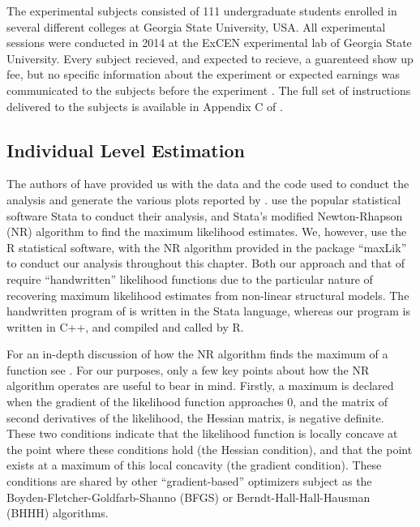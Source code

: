\documentclass[../main.tex]{subfiles}
\begin{document}
The experimental subjects consisted of 111 undergraduate students enrolled in several different colleges at Georgia State University, USA.
All experimental sessions were conducted in 2014 at the ExCEN experimental lab of Georgia State University. 
Every subject recieved, and expected to recieve, a guarenteed  show up fee, but no specific information about the experiment or expected earnings was communicated to the subjects before the experiment \parencite[98]{Harrison2016}.
The full set of instructions delivered to the subjects is available in Appendix C of \textcite{Harrison2016}.

\subsection{Individual Level Estimation}
\label{sec4:ILE}

The authors of \textcite{Harrison2016} have provided us with the data and the code used to conduct the analysis and generate the various plots reported by \textcite{Harrison2016}.
\textcite{Harrison2016} use the popular statistical software Stata to conduct their analysis, and Stata's modified Newton-Rhapson (NR) algorithm to find the maximum likelihood estimates.
We, however, use the R statistical software, with the NR algorithm provided in the package \enquote{maxLik} to conduct our analysis throughout this chapter.
Both our approach and that of \textcite{Harrison2016} require \enquote{handwritten} likelihood functions due to the particular nature of recovering maximum likelihood estimates from non-linear structural models.
The handwritten program of \textcite{Harrison2016} is written in the Stata language, whereas our program is written in C++, and compiled and called by R.

For an in-depth discussion of how the NR algorithm finds the maximum of a function see \textcite[213-219]{Train2002}.
For our purposes, only a few key points about how the NR algorithm operates are useful to bear in mind.
Firstly, a maximum is declared when the gradient of the likelihood function approaches 0, and the matrix of second derivatives of the likelihood, the Hessian matrix, is negative definite.
These two conditions indicate that the likelihood function is locally concave at the point where these conditions hold (the Hessian condition), and that the point exists at a maximum of this local concavity (the gradient condition).
These conditions are shared by other \enquote{gradient-based} optimizers subject as the Boyden-Fletcher-Goldfarb-Shanno (BFGS) or Berndt-Hall-Hall-Hausman (BHHH) algorithms.
\end{document}
